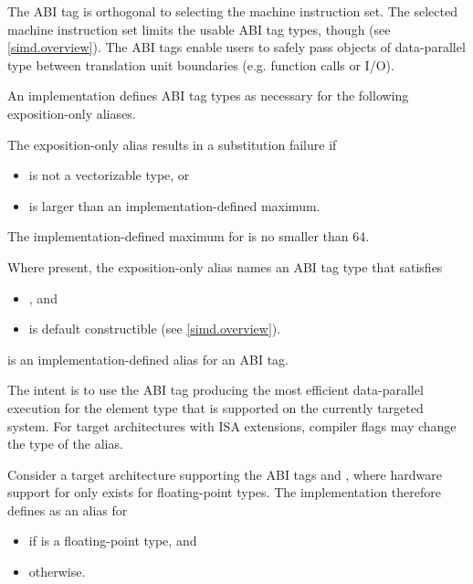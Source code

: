 \pnum
\begin{note}
The ABI tag is orthogonal to selecting the machine instruction set.
The selected machine instruction set limits the usable ABI tag types, though
(see \ref{simd.overview}).
The ABI tags enable users to safely pass objects of data-parallel type between
translation unit boundaries (e.g. function calls or I/O).
\end{note}

\pnum
An implementation defines ABI tag types as necessary for the following
exposition-only aliases.

\pnum
The exposition-only alias  results in a substitution
failure if
\begin{itemize}
  \item {} is not a vectorizable type, or
  \item {} is larger than an implementation-defined maximum.
\end{itemize}
The implementation-defined maximum for  is no smaller than 64.

\pnum
Where present, the exposition-only alias  names an ABI
tag type that satisfies
\begin{itemize}
  \item {}, and
  \item {} is default constructible (see \ref{simd.overview}).
\end{itemize}


\pnum
{} is an implementation-defined alias for an ABI tag.
\begin{note}
The intent is to use the ABI tag producing the most efficient data-parallel
execution for the element type  that is supported on the currently
targeted system.
For target architectures with ISA extensions, compiler flags may change the
type of the  alias.
\end{note}
\begin{example}
  Consider a target architecture supporting the ABI tags
   and , where hardware support for
   only exists for floating-point types.
  The implementation therefore defines  as an alias for
  \begin{itemize}
    \item {} if  is a floating-point type, and
    \item {} otherwise.
  \end{itemize}
\end{example}

